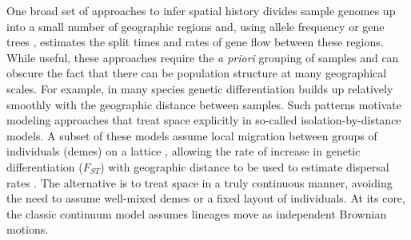 One broad set of approaches to infer spatial history divides sample genomes up into a small number of geographic regions and, using allele frequency \citep[e.g.,][]{excoffier2021fastsimcoal2} or gene trees \citep[e.g.,][]{muller2018mascot}, estimates the split times and rates of gene flow between these regions. While useful, these approaches require the \textit{a priori} grouping of samples and can obscure the fact that there can be population structure at many geographical scales. For example, in many species genetic differentiation builds up relatively smoothly with the geographic distance between samples. 
Such patterns motivate modeling approaches that treat space explicitly in so-called isolation-by-distance models.
A subset of these models assume local migration between groups of individuals (demes) on a lattice \citep[e.g. the stepping-stone ][]{Malecot1948, kimura1964stepping}, allowing the rate of increase in genetic differentiation ($F_{ST}$) with geographic distance to be used to estimate dispersal rates \citep{rousset1997genetic,rousset2000genetic}. The alternative is to treat space in a truly continuous manner, avoiding the need to assume well-mixed demes or a fixed layout of individuals.
At its core, the classic continuum model \citep{Wright1943,Malecot1948} assumes lineages move as independent Brownian motions.
